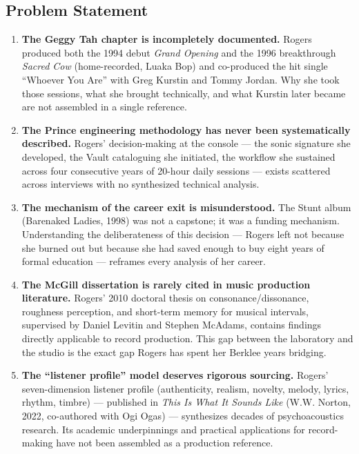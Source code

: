 \documentclass[11pt,letterpaper]{article}
\begin{document}
\subsection{Problem Statement}

\begin{enumerate}[leftmargin=2em]
  \item \textbf{The Geggy Tah chapter is incompletely documented.} Rogers produced both the 1994 debut \textit{Grand Opening} and the 1996 breakthrough \textit{Sacred Cow} (home-recorded, Luaka Bop) and co-produced the hit single ``Whoever You Are'' with Greg Kurstin and Tommy Jordan. Why she took those sessions, what she brought technically, and what Kurstin later became are not assembled in a single reference.

  \item \textbf{The Prince engineering methodology has never been systematically described.} Rogers' decision-making at the console --- the sonic signature she developed, the Vault cataloguing she initiated, the workflow she sustained across four consecutive years of 20-hour daily sessions --- exists scattered across interviews with no synthesized technical analysis.

  \item \textbf{The mechanism of the career exit is misunderstood.} The Stunt album (Barenaked Ladies, 1998) was not a capstone; it was a funding mechanism. Understanding the deliberateness of this decision --- Rogers left not because she burned out but because she had saved enough to buy eight years of formal education --- reframes every analysis of her career.

  \item \textbf{The McGill dissertation is rarely cited in music production literature.} Rogers' 2010 doctoral thesis on consonance/dissonance, roughness perception, and short-term memory for musical intervals, supervised by Daniel Levitin and Stephen McAdams, contains findings directly applicable to record production. This gap between the laboratory and the studio is the exact gap Rogers has spent her Berklee years bridging.

  \item \textbf{The ``listener profile'' model deserves rigorous sourcing.} Rogers' seven-dimension listener profile (authenticity, realism, novelty, melody, lyrics, rhythm, timbre) --- published in \textit{This Is What It Sounds Like} (W.W. Norton, 2022, co-authored with Ogi Ogas) --- synthesizes decades of psychoacoustics research. Its academic underpinnings and practical applications for record-making have not been assembled as a production reference.
\end{enumerate}
\end{document}
